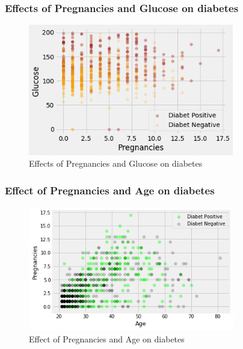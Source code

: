 \documentclass[11pt,en]{elegantpaper}
\begin{document}
\subsubsection{Effects of Pregnancies and Glucose on diabetes}
\begin{figure}[H]
    \centering
    \includegraphics[width=0.8\textwidth]{figure/f4.png}
    \caption{Effects of Pregnancies and Glucose on diabetes}
\end{figure}

\subsubsection{Effect of Pregnancies and Age on diabetes}
\begin{figure}[H]
    \centering
    \includegraphics[width=0.8\textwidth]{figure/f5.png}
    \caption{Effect of Pregnancies and Age on diabetes}
\end{figure}
\end{document}
